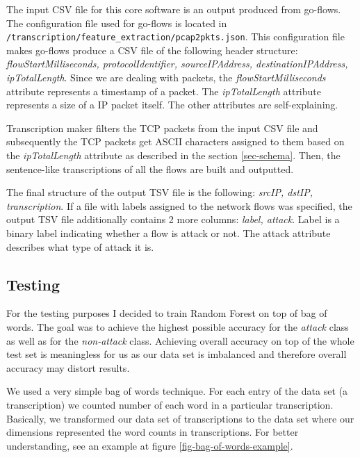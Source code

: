\documentclass{article}
\begin{document}
    The input CSV file for this core software is an output produced from go-flows. The configuration file used for go-flows is located in \verb|/transcription/feature_extraction/pcap2pkts.json|. This configuration file makes go-flows produce a CSV file of the following header structure: \textit{flowStartMilliseconds, protocolIdentifier, sourceIPAddress, destinationIPAddress, ipTotalLength}. Since we are dealing with packets, the \textit{flowStartMilliseconds} attribute represents a timestamp of a packet. The \textit{ipTotalLength} attribute represents a size of a IP packet itself. The other attributes are self-explaining.

    Transcription maker filters the TCP packets from the input CSV file and subsequently the TCP packets get ASCII characters assigned to them based on the \textit{ipTotalLength} attribute as described in the section \ref{sec-schema}. Then, the sentence-like transcriptions of all the flows are built and outputted.

    The final structure of the output TSV file is the following: \textit{srcIP, dstIP, transcription}. If a file with labels assigned to the network flows was specified, the output TSV file additionally contains 2 more columns: \textit{label, attack}. Label is a binary label indicating whether a flow is attack or not. The attack attribute describes what type of attack it is.


    \subsection{Testing}
    For the testing purposes I decided to train Random Forest on top of bag of words. The goal was to achieve the highest possible accuracy for the \textit{attack} class as well as for the \textit{non-attack} class. Achieving overall accuracy on top of the whole test set is meaningless for us as our data set is imbalanced and therefore overall accuracy may distort results.

    We used a very simple bag of words technique. For each entry of the data set (a transcription) we counted number of each word in a particular transcription. Basically, we transformed our data set of transcriptions to the data set where our dimensions represented the word counts in transcriptions. For better understanding, see an example at figure \ref{fig-bag-of-words-example}.
\end{document}
